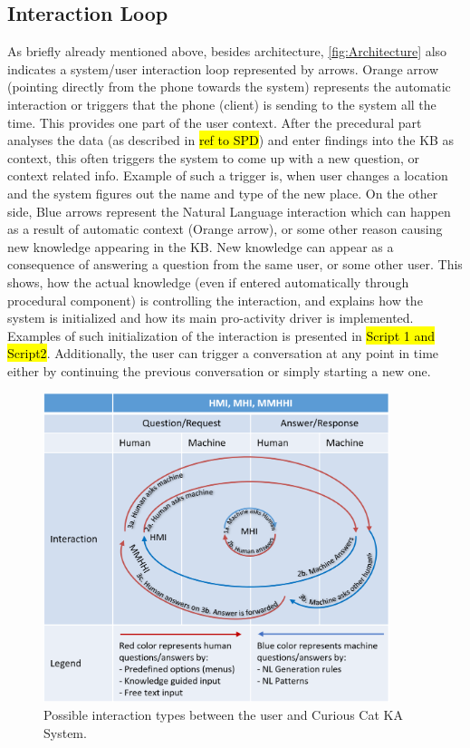\subsection{Interaction Loop}
\label{section:interaction}
As briefly already mentioned above, besides architecture, 
\autoref{fig:Architecture} also indicates a system/user interaction loop 
represented by arrows. Orange arrow (pointing 
directly from the phone towards the system) represents the automatic interaction
or triggers that the phone (client) is sending to the system all the time. This
provides one part of the user context. After the precedural part analyses
the data (as described in \hl{ref to SPD}) and enter findings into the KB as 
context, this often triggers the system to come up with a new question, or 
context related info. Example of such a trigger is, when user changes a location
and the system figures out the name and type of the new place. On the other 
side, Blue arrows represent the Natural Language interaction which can happen
as a result of automatic context (Orange arrow), or some other reason causing new 
knowledge appearing in the KB. New knowledge can appear as a consequence of
answering a question from the same user, or some other user. This shows, how the
actual knowledge (even if entered automatically through procedural component) is
controlling the interaction, and explains how the system is initialized and how
its main pro-activity driver is implemented. Examples of such initialization
of the interaction is presented in \hl{Script 1 and Script2}. Additionally, the 
user can trigger a conversation at any point in time either by continuing the 
previous conversation or simply starting a new one. 

\begin{figure}[htb]
	\centering
		\includegraphics[width=0.9\textwidth]{figures/interactionLoop.png}
	\caption{Possible interaction types between the user and Curious Cat KA
			 System.}
	\label{fig:interaction}
\end{figure}


